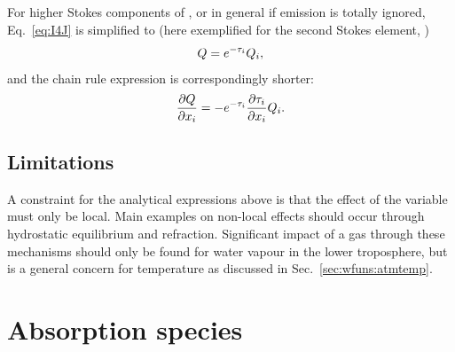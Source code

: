 For higher Stokes components of , or in general if emission is
totally ignored, Eq.~\ref{eq:I4J} is simplified to (here exemplified for the
second Stokes element, \StoQ)
\begin{equation}
  \label{eq:Q4J}
  Q = e^{-\tau_{i}}Q_{i},
\end{equation}
and the chain rule expression is correspondingly shorter:
\begin{equation}
  \frac{\partial Q}{\partial x_{i}} =
   -e^{-\tau_{i}}
   \frac{\partial\tau_{i}}{\partial x_{i}}Q_{i}.
  \label{eq:wfuns:dsdxi3}
\end{equation}


\subsection{Limitations}
\label{sec:wfuns:atmvars:limit}
%
A constraint for the analytical expressions above is that the effect of the
variable must only be local. Main examples on non-local effects should occur
through hydrostatic equilibrium and refraction. Significant impact of a gas
through these mechanisms should only be found for water vapour in the lower
troposphere, but is a general concern for temperature as discussed in
Sec.~\ref{sec:wfuns:atmtemp}.





\section{Absorption species}
\label{sec:wfuns:absspecies}

